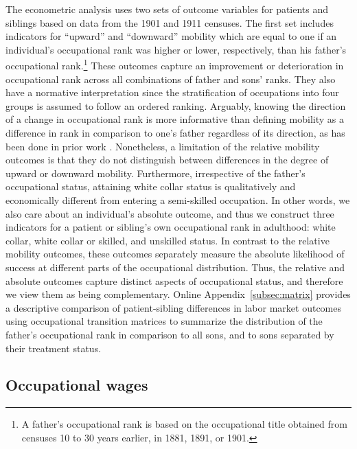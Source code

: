 \documentclass[12pt,english]{article}
\begin{document}
The econometric analysis uses two sets of outcome variables for patients and siblings based on data from the 1901 and 1911 censuses. The first set includes indicators for ``upward'' and ``downward'' mobility which are equal to one if an individual's occupational rank was higher or lower, respectively, than his father's occupational rank.\footnote{A father's occupational rank is based on the occupational title obtained from censuses 10 to 30 years earlier, in 1881, 1891, or 1901.} These outcomes capture an improvement or deterioration in occupational rank across all combinations of father and sons' ranks. They also have a normative interpretation since the stratification of occupations into four groups is assumed to follow an ordered ranking. Arguably, knowing the direction of a change in occupational rank is more informative than defining mobility as a difference in rank in comparison to one's father regardless of its direction, as has been done in prior work \citep{LongFerrie2013,Perez2019}. Nonetheless, a limitation of the relative mobility outcomes is that they do not distinguish between differences in the degree of upward or downward mobility. Furthermore, irrespective of the father's occupational status, attaining white collar status is qualitatively and economically different from entering a semi-skilled occupation. In other words, we also care about an individual's absolute outcome, and thus we construct three indicators for a patient or sibling's own occupational rank in adulthood: white collar, white collar or skilled, and unskilled status. In contrast to the relative mobility outcomes, these outcomes separately measure the absolute likelihood of success at different parts of the occupational distribution. Thus, the relative and absolute outcomes capture distinct aspects of occupational status, and therefore we view them as being complementary. Online Appendix~\ref{subsec:matrix} provides a descriptive comparison of patient-sibling differences in labor market outcomes using occupational transition matrices to summarize the distribution of the father's occupational rank in comparison to all sons, and to sons separated by their treatment status.

\subsection{Occupational wages\label{subsec:wages}}
\end{document}
